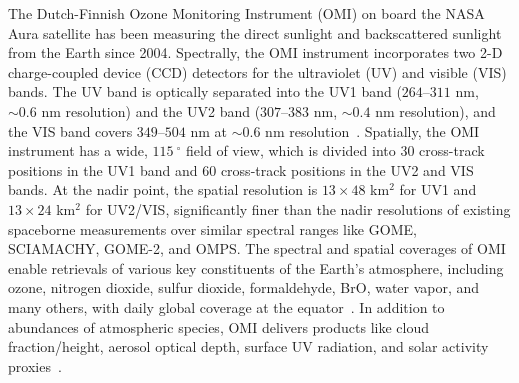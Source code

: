 \documentclass[amt,manuscript]{copernicus}
\begin{document}
\introduction  %
The Dutch-Finnish Ozone Monitoring Instrument (OMI) on board the NASA Aura satellite has been measuring the direct sunlight and backscattered sunlight from the Earth since 2004. Spectrally, the OMI instrument incorporates two 2-D charge-coupled device (CCD) detectors for the ultraviolet (UV) and visible (VIS) bands. The UV band is optically separated into the UV1 band ($264$--$311$ nm, $\sim0.6$ nm resolution) and the UV2 band ($307$--$383$ nm, $\sim0.4$ nm resolution), and the VIS band covers $349$--$504$ nm at $\sim0.6$ nm resolution~\citep{dirksen2006prelaunch}. Spatially, the OMI instrument has a wide, $115~^{\circ}$ field of view, which is divided into 30 cross-track positions in the UV1 band and 60 cross-track positions in the UV2 and VIS bands. At the nadir point, the spatial resolution is $13\times 48$ km$^2$ for UV1 and $13\times 24$ km$^2$ for UV2/VIS, significantly finer than the nadir resolutions of existing spaceborne measurements over similar spectral ranges like GOME, SCIAMACHY, GOME-2, and OMPS. The spectral and spatial coverages of OMI enable retrievals of various key constituents of the Earth's atmosphere, including ozone, nitrogen dioxide, sulfur dioxide, formaldehyde, BrO, water vapor, and many others, with daily global coverage at the equator~\citep{levelt2006}. In addition to abundances of atmospheric species, OMI delivers products like cloud fraction/height, aerosol optical depth, surface UV radiation, and solar activity proxies~\citep{tanskanen2006surface,torres2007aerosols,vasilkov2007evaluation,deland2013the}.
\end{document}

